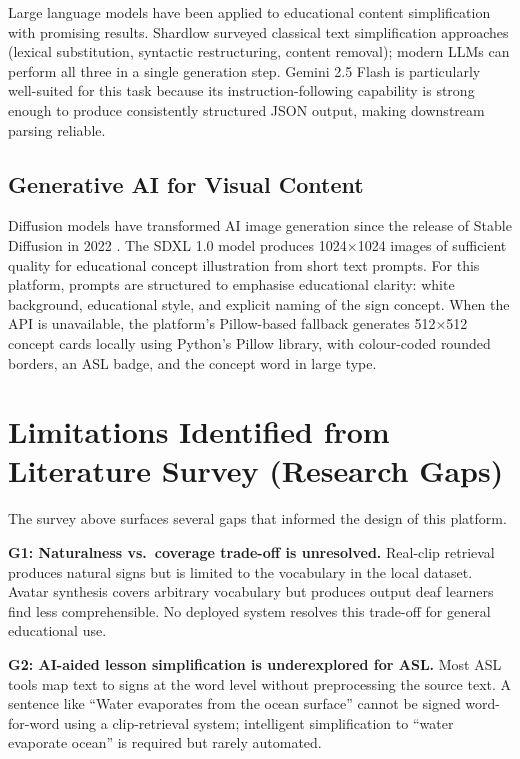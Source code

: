 \documentclass[12pt,a4paper,oneside]{report}
\begin{document}
Large language models have been applied to educational content simplification with promising results. Shardlow \cite{shardlow2014text} surveyed classical text simplification approaches (lexical substitution, syntactic restructuring, content removal); modern LLMs can perform all three in a single generation step. Gemini 2.5 Flash is particularly well-suited for this task because its instruction-following capability is strong enough to produce consistently structured JSON output, making downstream parsing reliable.

\subsection{Generative AI for Visual Content}

Diffusion models have transformed AI image generation since the release of Stable Diffusion in 2022 \cite{rombach2022high}. The SDXL 1.0 model \cite{podell2023sdxl} produces 1024$\times$1024 images of sufficient quality for educational concept illustration from short text prompts. For this platform, prompts are structured to emphasise educational clarity: white background, educational style, and explicit naming of the sign concept. When the API is unavailable, the platform's Pillow-based fallback generates 512$\times$512 concept cards locally using Python's Pillow library, with colour-coded rounded borders, an ASL badge, and the concept word in large type.

\section{Limitations Identified from Literature Survey (Research Gaps)}

The survey above surfaces several gaps that informed the design of this platform.

\textbf{G1: Naturalness vs.\ coverage trade-off is unresolved.} Real-clip retrieval produces natural signs but is limited to the vocabulary in the local dataset. Avatar synthesis covers arbitrary vocabulary but produces output deaf learners find less comprehensible. No deployed system resolves this trade-off for general educational use.

\textbf{G2: AI-aided lesson simplification is underexplored for ASL.} Most ASL tools map text to signs at the word level without preprocessing the source text. A sentence like ``Water evaporates from the ocean surface'' cannot be signed word-for-word using a clip-retrieval system; intelligent simplification to ``water evaporate ocean'' is required but rarely automated.
\end{document}
